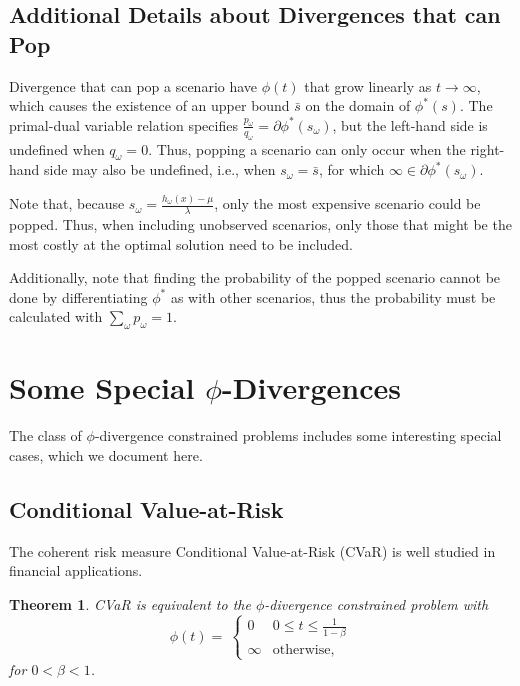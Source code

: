 \documentclass[11pt]{article}
\newtheorem{theorem}{Theorem}
\begin{document}
\subsection{Additional Details about Divergences that can Pop}

Divergence that can pop a scenario have $\phi(t)$ that grow linearly as $t \rightarrow \infty$, which causes the existence of an upper bound $\bar{s}$ on the domain of $\phi^*(s)$.
The primal-dual variable relation specifies $\frac{p_\omega}{q_\omega} = \partial \phi^*(s_\omega)$, but the left-hand side is undefined when $q_\omega = 0$.
Thus, popping a scenario can only occur when the right-hand side may also be undefined, i.e., when $s_\omega = \bar{s}$, for which $\infty \in \partial \phi^*(s_\omega)$.

Note that, because $s_\omega = \frac{h_\omega(x) - \mu}{\lambda}$, only the most expensive scenario could be popped.
Thus, when including unobserved scenarios, only those that might be the most costly at the optimal solution need to be included.

Additionally, note that finding the probability of the popped scenario cannot be done by differentiating $\phi^*$ as with other scenarios, thus the probability must be calculated with $\sum_\omega p_\omega = 1$.


\section{Some Special $\phi$-Divergences}

The class of $\phi$-divergence constrained problems includes some interesting special cases, which we document here.

\subsection{Conditional Value-at-Risk}

The coherent risk measure Conditional Value-at-Risk (CVaR) is well studied in financial applications.
\begin{theorem} \label{thm:cvar}
	CVaR is equivalent to the $\phi$-divergence constrained problem with 
	\[
		\phi(t) = \
		\begin{cases}
			0 & 0 \leq t \leq \frac{1}{1-\beta} \\
			\infty & \text{otherwise},
		\end{cases}
	\]
	for $0 < \beta < 1$.
\end{theorem}
\end{document}
